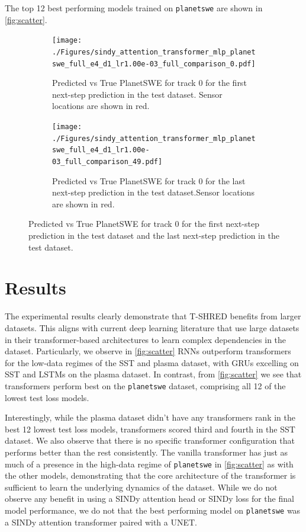 \documentclass[11pt, a4paper]{article}
\begin{document}
The top 12 best performing models trained on \texttt{planetswe} are shown in \autoref{fig:scatter}.

\begin{figure}[H]
    \centering
    \begin{subfigure}[t]{\textwidth}
        \centering
        \texttt{[image: ./Figures/sindy\_attention\_transformer\_mlp\_planetswe\_full\_e4\_d1\_lr1.00e-03\_full\_comparison\_0.pdf]}
        \caption{Predicted vs True PlanetSWE for track 0 for the first next-step prediction in the test dataset. Sensor locations are shown in red.}\label{fig:planetswe_full_0}
    \end{subfigure}
    \begin{subfigure}[t]{\textwidth}
        \centering
        \texttt{[image: ./Figures/sindy\_attention\_transformer\_mlp\_planetswe\_full\_e4\_d1\_lr1.00e-03\_full\_comparison\_49.pdf]}
        \caption{Predicted vs True PlanetSWE for track 0 for the last next-step prediction in the test dataset.Sensor locations are shown in red.}\label{fig:planetswe_full_49}
    \end{subfigure}
    \caption{Predicted vs True PlanetSWE for track 0 for the first next-step prediction in the test dataset and the last next-step prediction in the test dataset.}\label{fig:planetswe_pod}
\end{figure}

\section{Results}

The experimental results clearly demonstrate that T-SHRED benefits from larger datasets. This aligns with current deep learning literature that use large datasets in their transformer-based architectures to learn complex dependencies in the dataset. Particularly, we observe in \autoref{fig:scatter} RNNs outperform transformers for the low-data regimes of the SST and plasma dataset, with GRUs excelling on SST and LSTMs on the plasma dataset. In contrast, from \autoref{fig:scatter} we see that transformers perform best on the \texttt{planetswe} dataset, comprising all 12 of the lowest test loss models.

Interestingly, while the plasma dataset didn't have any transformers rank in the best 12 lowest test loss models, transformers scored third and fourth in the SST dataset. We also observe that there is no specific transformer configuration that performs better than the rest consistently. The vanilla transformer has just as much of a presence in the high-data regime of \texttt{planetswe} in \autoref{fig:scatter} as with the other models, demonstrating that the core architecture of the transformer is sufficient to learn the underlying dynamics of the dataset. While we do not observe any benefit in using a SINDy attention head or SINDy loss for the final model performance, we do not that the best performing model on \texttt{planetswe} was a SINDy attention transformer paired with a UNET.
\end{document}
